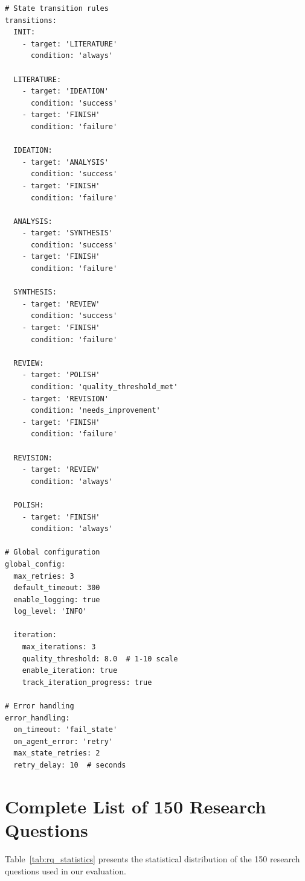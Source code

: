 \documentclass[runningheads]{llncs}
\begin{document}
\begin{verbatim}
# State transition rules
transitions:
  INIT:
    - target: 'LITERATURE'
      condition: 'always'
      
  LITERATURE:
    - target: 'IDEATION'
      condition: 'success'
    - target: 'FINISH'
      condition: 'failure'
      
  IDEATION:
    - target: 'ANALYSIS'
      condition: 'success'
    - target: 'FINISH'
      condition: 'failure'
      
  ANALYSIS:
    - target: 'SYNTHESIS'
      condition: 'success'
    - target: 'FINISH'
      condition: 'failure'
      
  SYNTHESIS:
    - target: 'REVIEW'
      condition: 'success'
    - target: 'FINISH'
      condition: 'failure'
      
  REVIEW:
    - target: 'POLISH'
      condition: 'quality_threshold_met'
    - target: 'REVISION'
      condition: 'needs_improvement'
    - target: 'FINISH'
      condition: 'failure'
      
  REVISION:
    - target: 'REVIEW'
      condition: 'always'
      
  POLISH:
    - target: 'FINISH'
      condition: 'always'

# Global configuration
global_config:
  max_retries: 3
  default_timeout: 300
  enable_logging: true
  log_level: 'INFO'
  
  iteration:
    max_iterations: 3
    quality_threshold: 8.0  # 1-10 scale
    enable_iteration: true
    track_iteration_progress: true

# Error handling
error_handling:
  on_timeout: 'fail_state'
  on_agent_error: 'retry'
  max_state_retries: 2
  retry_delay: 10  # seconds
\end{verbatim}

\section{Complete List of 150 Research Questions}
\label{app:rq_list}

Table~\ref{tab:rq_statistics} presents the statistical distribution of the 150 research questions used in our evaluation.
\end{document}
